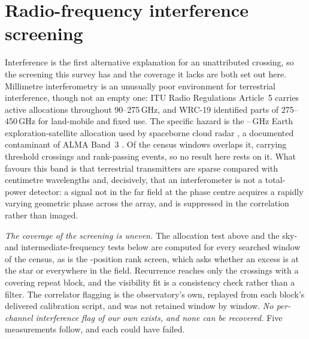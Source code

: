 \section{Radio-frequency interference screening}
\label{app:rfi}

Interference is the first alternative explanation for an unattributed
crossing, so the screening this survey has and the coverage it lacks are both
set out here. Millimetre interferometry is an unusually poor
environment for terrestrial interference, though not an empty one: ITU Radio
Regulations Article~5 \citep{ITU2024} carries active allocations throughout
90--275\,GHz, and WRC-19 identified parts of 275--450\,GHz for land-mobile and
fixed use. The specific hazard is the \RadarLo--\RadarHi\,GHz Earth
exploration-satellite allocation used by spaceborne cloud radar
\citep{CloudSat2002,EarthCARE2023}, a documented contaminant of ALMA Band~3
\citep{ALMAMemo504}. Of the \RadarNTot{} census windows \RadarNWin{} overlaps
it, carrying \RadarNCross{} threshold crossings and \RadarNStage{}
rank-passing events, so no result here rests on it. What favours this band
is that terrestrial
transmitters are sparse compared with centimetre wavelengths and, decisively,
that an interferometer is not a total-power detector: a signal not in the far
field at the phase centre acquires a rapidly varying geometric phase across
the array, and is suppressed in the correlation rather than imaged.

\emph{The coverage of the screening is uneven.} The allocation test above and
the sky- and intermediate-frequency tests below are computed for every
searched window of the census, as is the \NCtrl-position rank screen, which
asks whether an excess is at the star or everywhere in the field. Recurrence
reaches only the crossings with a covering repeat block, and the visibility
fit is a consistency check rather than a filter. The correlator flagging is
the observatory's own, replayed from each block's delivered calibration
script, and was not retained window by window. \emph{No per-channel
interference flag of our own exists, and none can be recovered.} Five
measurements follow, and each could have failed.

